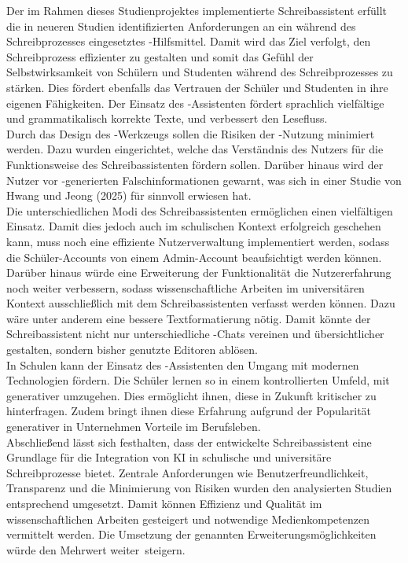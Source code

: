 \documentclass[../main.tex]{subfiles}
\begin{document}
Der im Rahmen dieses Studienprojektes implementierte Schreibassistent erfüllt die in neueren Studien identifizierten Anforderungen an ein während des Schreibprozesses eingesetztes 
-Hilfsmittel. Damit wird das Ziel verfolgt, den Schreibprozess effizienter zu gestalten und somit das Gefühl der Selbstwirksamkeit von Schülern und Studenten während des 
Schreibprozesses zu stärken. Dies fördert ebenfalls das Vertrauen der Schüler und Studenten in ihre eigenen Fähigkeiten. Der Einsatz des -Assistenten fördert sprachlich vielfältige 
und grammatikalisch korrekte Texte, und verbessert den Lesefluss. \\
Durch das Design des -Werkzeugs sollen die Risiken der -Nutzung minimiert werden. Dazu wurden  eingerichtet, welche das Verständnis des Nutzers für die Funktionsweise des 
Schreibassistenten fördern sollen. Darüber hinaus wird der Nutzer vor -generierten Falschinformationen gewarnt, was sich in einer Studie von Hwang und Jeong (2025) für sinnvoll 
erwiesen hat. \\
Die unterschiedlichen Modi des Schreibassistenten ermöglichen einen vielfältigen Einsatz. Damit dies jedoch auch im schulischen Kontext erfolgreich geschehen kann, muss noch eine 
effiziente Nutzerverwaltung implementiert werden, sodass die Schüler-Accounts von einem Admin-Account beaufsichtigt werden können.\\
Darüber hinaus würde eine Erweiterung der Funktionalität die Nutzererfahrung noch weiter verbessern, sodass wissenschaftliche Arbeiten im universitären Kontext ausschließlich 
mit dem Schreibassistenten verfasst werden können. Dazu wäre unter anderem eine bessere Textformatierung nötig. Damit könnte der Schreibassistent nicht nur unterschiedliche -Chats vereinen und übersichtlicher gestalten, sondern bisher genutzte 
Editoren ablösen.\\
In Schulen kann der Einsatz des -Assistenten den Umgang mit modernen Technologien fördern. Die Schüler lernen so in einem kontrollierten Umfeld, mit generativer  umzugehen. 
Dies ermöglicht ihnen, diese in Zukunft kritischer zu hinterfragen. Zudem bringt ihnen diese Erfahrung aufgrund der Popularität generativer  in Unternehmen Vorteile im Berufsleben.\\
Abschließend lässt sich festhalten, dass der entwickelte Schreibassistent eine Grundlage für die Integration von KI in schulische und universitäre Schreibprozesse bietet. 
Zentrale Anforderungen wie Benutzerfreundlichkeit, Transparenz und die Minimierung von Risiken wurden den analysierten Studien entsprechend umgesetzt. 
Damit können Effizienz und Qualität im wissenschaftlichen Arbeiten gesteigert und notwendige Medienkompetenzen vermittelt werden. Die Umsetzung der genannten Erweiterungsmöglichkeiten würde 
den Mehrwert \mbox{weiter steigern.} 
\end{document}
